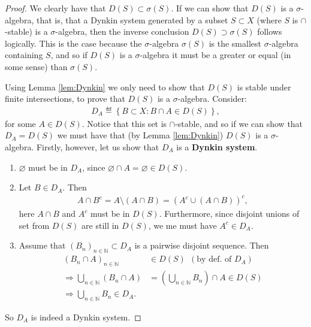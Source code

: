 \begin{proof}
    We clearly have that \(D(S) \subset \sigma(S)\). If we can show
    that \(D(S)\) is a \(\sigma\)-algebra, that is, that a Dynkin system generated by a subset \(S \subset X\) (where \(S\) is 
    \(\cap\)-stable) is a \(\sigma\)-algebra, then the inverse conclusion \(D(S) \supset \sigma(S)\) follows logically. This is the case
    because the \(\sigma\)-algebra \(\sigma(S)\) is the smallest \(\sigma\)-algebra containing \(S\), and so if \(D(S)\) is a 
    \(\sigma\)-algebra it must be a greater or equal (in some sense) than \(\sigma(S)\). 

    Using Lemma \ref{lem:Dynkin} we only need to show that \(D(S)\) is stable under finite intersections, to prove that \(D(S)\) is a
    \(\sigma\)-algebra. Consider:
    \begin{align*}
        D_{A} \eqdef \left\{B \subset X : B \cap A \in D(S)\right\},
    \end{align*}
    for some \(A\in D(S)\). Notice that this set is \(\cap\)-stable, and so if we can show that \(D_{A} = D(S)\) we must have that 
    (by Lemma \ref{lem:Dynkin}) \(D(S)\) is a \(\sigma\)-algebra. Firstly, however, let us show that \(D_{A}\) is a \textbf{Dynkin system}. 
    
    \begin{enumerate}
        \item \(\varnothing\) must be in \(D_A\), since \(\varnothing \cap A = \varnothing \in D(S)\).
        \item Let \(B\in D_A\). Then
        \begin{align*}
            A \cap B^c = A \setminus \left(A \cap B\right) = \left( A^c \cup \left(A \cap B\right) \right)^c,
        \end{align*}
        here \(A \cap B\) and \(A^c\) must be in \(D(S)\). Furthermore, since disjoint unions of set from \(D(S)\) are still in \(D(S)\), we
        me must have \(A^c \in D_A\).
        \item Assume that \(\left(B_n\right)_{n\in\mathbb{N}} \subset D_A\) is a pairwise disjoint sequence. Then
        \begin{align*}
            \left(B_n \cap A\right)_{n\in\mathbb{N}} & \in D(S) \ \ (\text{by def. of }D_A) \\
            \Rightarrow \bigcup\limits_{n\in\mathbb{N}} \left(B_n\cap A\right)& = \left(\bigcup\limits_{n\in\mathbb{N}} B_n\right) \cap A
            \in D(S) \\
            \Rightarrow \bigcup\limits_{n\in\mathbb{N}}B_n \in D_A.&
        \end{align*}
    \end{enumerate}
    So \(D_A\) is indeed a Dynkin system. 


\end{proof}
